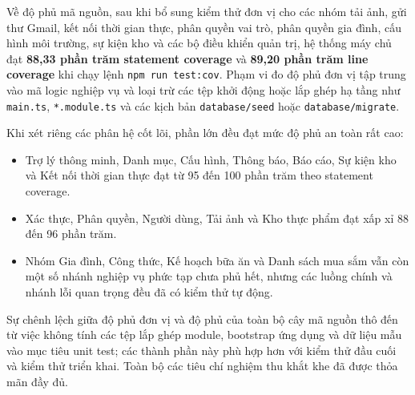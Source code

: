 \documentclass[../main.tex]{subfiles}
\begin{document}
Về độ phủ mã nguồn, sau khi bổ sung kiểm thử đơn vị cho các nhóm tải ảnh, gửi thư Gmail, kết nối thời gian thực, phân quyền vai trò, phân quyền gia đình, cấu hình môi trường, sự kiện kho và các bộ điều khiển quản trị, hệ thống máy chủ đạt \textbf{88,33 phần trăm statement coverage} và \textbf{89,20 phần trăm line coverage} khi chạy lệnh \texttt{npm run test:cov}. Phạm vi đo độ phủ đơn vị tập trung vào mã logic nghiệp vụ và loại trừ các tệp khởi động hoặc lắp ghép hạ tầng như \texttt{main.ts}, \texttt{*.module.ts} và các kịch bản \texttt{database/seed} hoặc \texttt{database/migrate}.

Khi xét riêng các phân hệ cốt lõi, phần lớn đều đạt mức độ phủ an toàn rất cao:
\begin{itemize}
    \item Trợ lý thông minh, Danh mục, Cấu hình, Thông báo, Báo cáo, Sự kiện kho và Kết nối thời gian thực đạt từ 95 đến 100 phần trăm theo statement coverage.
    \item Xác thực, Phân quyền, Người dùng, Tải ảnh và Kho thực phẩm đạt xấp xỉ 88 đến 96 phần trăm.
    \item Nhóm Gia đình, Công thức, Kế hoạch bữa ăn và Danh sách mua sắm vẫn còn một số nhánh nghiệp vụ phức tạp chưa phủ hết, nhưng các luồng chính và nhánh lỗi quan trọng đều đã có kiểm thử tự động.
\end{itemize}
Sự chênh lệch giữa độ phủ đơn vị và độ phủ của toàn bộ cây mã nguồn thô đến từ việc không tính các tệp lắp ghép module, bootstrap ứng dụng và dữ liệu mẫu vào mục tiêu unit test; các thành phần này phù hợp hơn với kiểm thử đầu cuối và kiểm thử triển khai. Toàn bộ các tiêu chí nghiệm thu khắt khe đã được thỏa mãn đầy đủ.
\end{document}
